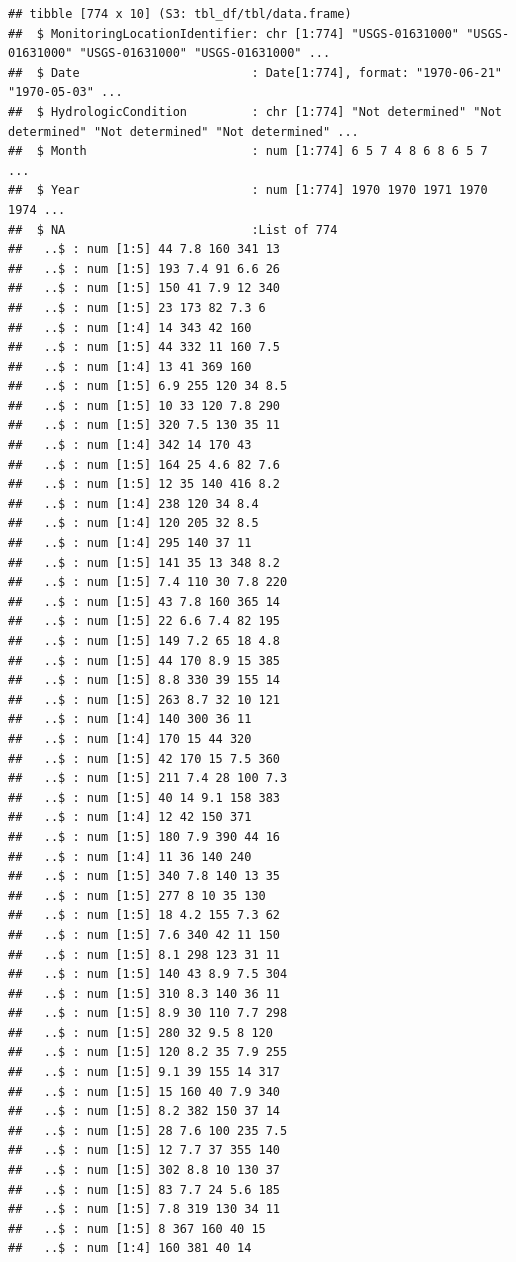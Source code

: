 \documentclass[
  12pt,
]{article}
\begin{document}
\begin{verbatim}
## tibble [774 x 10] (S3: tbl_df/tbl/data.frame)
##  $ MonitoringLocationIdentifier: chr [1:774] "USGS-01631000" "USGS-01631000" "USGS-01631000" "USGS-01631000" ...
##  $ Date                        : Date[1:774], format: "1970-06-21" "1970-05-03" ...
##  $ HydrologicCondition         : chr [1:774] "Not determined" "Not determined" "Not determined" "Not determined" ...
##  $ Month                       : num [1:774] 6 5 7 4 8 6 8 6 5 7 ...
##  $ Year                        : num [1:774] 1970 1970 1971 1970 1974 ...
##  $ NA                          :List of 774
##   ..$ : num [1:5] 44 7.8 160 341 13
##   ..$ : num [1:5] 193 7.4 91 6.6 26
##   ..$ : num [1:5] 150 41 7.9 12 340
##   ..$ : num [1:5] 23 173 82 7.3 6
##   ..$ : num [1:4] 14 343 42 160
##   ..$ : num [1:5] 44 332 11 160 7.5
##   ..$ : num [1:4] 13 41 369 160
##   ..$ : num [1:5] 6.9 255 120 34 8.5
##   ..$ : num [1:5] 10 33 120 7.8 290
##   ..$ : num [1:5] 320 7.5 130 35 11
##   ..$ : num [1:4] 342 14 170 43
##   ..$ : num [1:5] 164 25 4.6 82 7.6
##   ..$ : num [1:5] 12 35 140 416 8.2
##   ..$ : num [1:4] 238 120 34 8.4
##   ..$ : num [1:4] 120 205 32 8.5
##   ..$ : num [1:4] 295 140 37 11
##   ..$ : num [1:5] 141 35 13 348 8.2
##   ..$ : num [1:5] 7.4 110 30 7.8 220
##   ..$ : num [1:5] 43 7.8 160 365 14
##   ..$ : num [1:5] 22 6.6 7.4 82 195
##   ..$ : num [1:5] 149 7.2 65 18 4.8
##   ..$ : num [1:5] 44 170 8.9 15 385
##   ..$ : num [1:5] 8.8 330 39 155 14
##   ..$ : num [1:5] 263 8.7 32 10 121
##   ..$ : num [1:4] 140 300 36 11
##   ..$ : num [1:4] 170 15 44 320
##   ..$ : num [1:5] 42 170 15 7.5 360
##   ..$ : num [1:5] 211 7.4 28 100 7.3
##   ..$ : num [1:5] 40 14 9.1 158 383
##   ..$ : num [1:4] 12 42 150 371
##   ..$ : num [1:5] 180 7.9 390 44 16
##   ..$ : num [1:4] 11 36 140 240
##   ..$ : num [1:5] 340 7.8 140 13 35
##   ..$ : num [1:5] 277 8 10 35 130
##   ..$ : num [1:5] 18 4.2 155 7.3 62
##   ..$ : num [1:5] 7.6 340 42 11 150
##   ..$ : num [1:5] 8.1 298 123 31 11
##   ..$ : num [1:5] 140 43 8.9 7.5 304
##   ..$ : num [1:5] 310 8.3 140 36 11
##   ..$ : num [1:5] 8.9 30 110 7.7 298
##   ..$ : num [1:5] 280 32 9.5 8 120
##   ..$ : num [1:5] 120 8.2 35 7.9 255
##   ..$ : num [1:5] 9.1 39 155 14 317
##   ..$ : num [1:5] 15 160 40 7.9 340
##   ..$ : num [1:5] 8.2 382 150 37 14
##   ..$ : num [1:5] 28 7.6 100 235 7.5
##   ..$ : num [1:5] 12 7.7 37 355 140
##   ..$ : num [1:5] 302 8.8 10 130 37
##   ..$ : num [1:5] 83 7.7 24 5.6 185
##   ..$ : num [1:5] 7.8 319 130 34 11
##   ..$ : num [1:5] 8 367 160 40 15
##   ..$ : num [1:4] 160 381 40 14

\end{verbatim}
\end{document}
